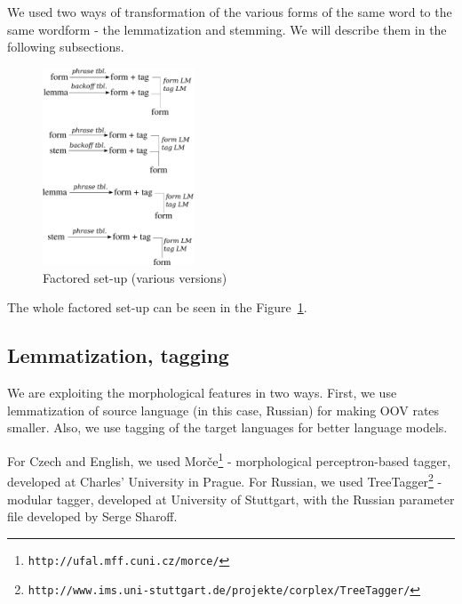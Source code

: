 \documentclass[11pt,letterpaper]{article}
\begin{document}
We used two ways of transformation of the various forms of the same word to the same wordform - the lemmatization and stemming. We will describe them in the following subsections.

\begin{figure}
\centering
\includegraphics[width=0.4\textwidth]{graf_moses}
\caption{Factored set-up (various versions)}
\label{graf:mss}
\end{figure}

The whole factored set-up can be seen in the Figure~\ref{graf:mss}.

\subsection{Lemmatization, tagging}



We are exploiting the morphological features in two ways. First, we use lemmatization of source language (in this case, Russian) for making OOV rates smaller. Also, we use tagging of the target languages for better language models.

For Czech and English, we used Morče\footnote{\texttt{http://ufal.mff.cuni.cz/morce/}} - morphological perceptron-based tagger, developed at Charles' University in Prague. For Russian, we used TreeTagger\footnote{\texttt{http://www.ims.uni-stuttgart.de/projekte/corplex/TreeTagger/}} - modular tagger, developed at University of Stuttgart, with the Russian parameter file developed by Serge Sharoff.
\end{document}
